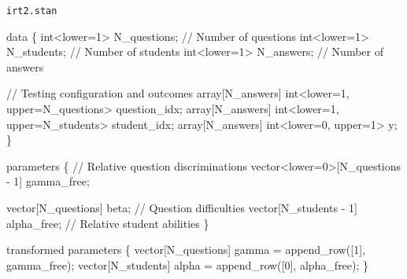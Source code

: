 \documentclass[
  letterpaper,
  DIV=11,
  numbers=noendperiod]{scrartcl}
\newenvironment{Shaded}{\begin{snugshade}}{\end{snugshade}}
\newcommand{\CommentTok}[1]{\textcolor[rgb]{0.37,0.37,0.37}{#1}}
\newcommand{\DataTypeTok}[1]{\textcolor[rgb]{0.68,0.00,0.00}{#1}}
\newcommand{\DecValTok}[1]{\textcolor[rgb]{0.68,0.00,0.00}{#1}}
\newcommand{\KeywordTok}[1]{\textcolor[rgb]{0.00,0.23,0.31}{#1}}
\newcommand{\NormalTok}[1]{\textcolor[rgb]{0.00,0.23,0.31}{#1}}
\begin{document}
\begin{codelisting}

\caption{\texttt{irt2.stan}}

\begin{Shaded}
\begin{Highlighting}[]
\KeywordTok{data}\NormalTok{ \{}
  \DataTypeTok{int}\NormalTok{\textless{}}\KeywordTok{lower}\NormalTok{=}\DecValTok{1}\NormalTok{\textgreater{} N\_questions; }\CommentTok{// Number of questions}
  \DataTypeTok{int}\NormalTok{\textless{}}\KeywordTok{lower}\NormalTok{=}\DecValTok{1}\NormalTok{\textgreater{} N\_students;  }\CommentTok{// Number of students}
  \DataTypeTok{int}\NormalTok{\textless{}}\KeywordTok{lower}\NormalTok{=}\DecValTok{1}\NormalTok{\textgreater{} N\_answers;   }\CommentTok{// Number of answers}

  \CommentTok{// Testing configuration and outcomes}
  \DataTypeTok{array}\NormalTok{[N\_answers] }\DataTypeTok{int}\NormalTok{\textless{}}\KeywordTok{lower}\NormalTok{=}\DecValTok{1}\NormalTok{, }\KeywordTok{upper}\NormalTok{=N\_questions\textgreater{} question\_idx;}
  \DataTypeTok{array}\NormalTok{[N\_answers] }\DataTypeTok{int}\NormalTok{\textless{}}\KeywordTok{lower}\NormalTok{=}\DecValTok{1}\NormalTok{, }\KeywordTok{upper}\NormalTok{=N\_students\textgreater{}  student\_idx;}
  \DataTypeTok{array}\NormalTok{[N\_answers] }\DataTypeTok{int}\NormalTok{\textless{}}\KeywordTok{lower}\NormalTok{=}\DecValTok{0}\NormalTok{, }\KeywordTok{upper}\NormalTok{=}\DecValTok{1}\NormalTok{\textgreater{} y;}
\NormalTok{\}}

\KeywordTok{parameters}\NormalTok{ \{}
  \CommentTok{// Relative question discriminations}
  \DataTypeTok{vector}\NormalTok{\textless{}}\KeywordTok{lower}\NormalTok{=}\DecValTok{0}\NormalTok{\textgreater{}[N\_questions {-} }\DecValTok{1}\NormalTok{] gamma\_free;}

  \DataTypeTok{vector}\NormalTok{[N\_questions]    beta;       }\CommentTok{// Question difficulties}
  \DataTypeTok{vector}\NormalTok{[N\_students {-} }\DecValTok{1}\NormalTok{] alpha\_free; }\CommentTok{// Relative student abilities}
\NormalTok{\}}

\KeywordTok{transformed parameters}\NormalTok{ \{}
  \DataTypeTok{vector}\NormalTok{[N\_questions] gamma = append\_row([}\DecValTok{1}\NormalTok{]\textquotesingle{}, gamma\_free);}
  \DataTypeTok{vector}\NormalTok{[N\_students] alpha = append\_row([}\DecValTok{0}\NormalTok{]\textquotesingle{}, alpha\_free);}
\NormalTok{\}}


\end{Highlighting}
\end{Shaded}
\end{codelisting}
\end{document}
